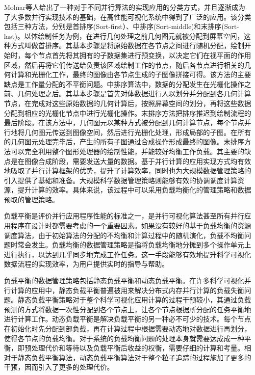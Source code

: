 Molnar等人\parencite{molnar1994a}给出了一种对于不同并行算法的实现应用的分类方式，并且逐渐成为了大多数并行实现技术的基础，在高性能可视化系统中得到了广泛的应用。该分类包括三种方法，分别是首排序(Sort-first）、中排序(Sort-middle)和末排序(Sort-last)。以体绘制任务为例，在进行几何处理之前几何图元就被分配到屏幕空间，这种方式叫做首排序。其基本步骤是将原始数据在各节点之间进行随机分配，绘制开始时，每个节点首先将其拥有的子数据集进行预变换，以决定它们在视平面的作用区域，然后再将它们传送给负责该区域绘制工作的节点，随后各节点进行相关的几何计算和光栅化工作，最终的图像由各节点生成的子图像拼接可得。该方法的主要缺点是工作量分配的不平衡问题。中排序算法中，数据的分配发生在光栅化操作之前、几何处理之后。其基本步骤是首先对体数据进行人以划分并分配到各几何计算节点，在完成对这些原始数据的几何计算后，按照屏幕空间的划分，再将这些数据分配到相应的光栅化节点中进行光栅化操作。末排序方法把排序推迟到绘制流程的最后阶段。在该方法中，几何图元以某种方式被分配到几何计算节点，每个节点并行地将几何图元传送到图像空间，然后进行光栅化处理，形成局部的子图。在所有的几何图元处理完毕后，产生的所有子图通过合成操作形成最终的图像。末排序方法可以完全利用整个图形处理器的绘制性能，并能较好均衡工作负载。其主要的缺点是在图像合成阶段，需要发送大量的数据。基于并行计算的应用实现方式均有效地吸取了并行计算框架的优势，提升了计算效率，同时也为大规模数据管理策略的引入提供了基础和准备。大规模科学数据管理策略则能够有效的协调调度计算资源，提升计算的效率。具体来说，该过程中可以采用负载均衡化的管理策略和数据预取的管理策略。

负载平衡是评价并行应用程序性能的标准之一，是并行可视化算法甚至所有并行应用程序在设计时都需要考虑的一个重要因素。如果没有较好的基于负载均衡的资源调度算法，由于初始算法的分配的不均衡和计算过程中的随机演化，负载不均衡问题时常会发生。负载均衡的数据管理策略是指将负载均衡地分摊到多个操作单元上进行执行，以达到几乎同步地完成工作任务。这一手段能够有效地提升科学可视化数据流程的实现效率，为用户提供实时的指导与帮助。

负载平衡的数据管理策略包括静态负载平衡和动态负载平衡。在许多科学可视化并行计算的应用中，静态负载平衡普遍被用来解决分布式内存并行计算的负载失衡问题。静态负载平衡策略对于整个科学可视化应用计算的过程干预较小，其通过负载预测的方式将数据一次性分配到各个节点上，让各个节点根据所分配的任务平衡地进行计算工作。动态负载平衡是解决负载平衡的另一种必不可少的技术。每个节点在初始化时先分配到部负载，再在计算过程中根据需要动态地对数据进行再划分，使得各节点的负载均衡。对于系统的负载均衡问题的处理本身就需要达成成一种平衡，即预处理代价和等待以及负载平衡后收益的权衡，需要仔细的计算和考量。相对于静态负载平衡算法，动态负载平衡算法对于整个粒子追踪的过程施加了更多的干预，因而引入了更多的处理代价。

